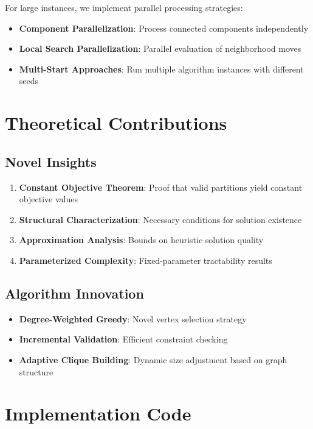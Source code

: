 \documentclass[12pt,a4paper]{article}
\begin{document}
For large instances, we implement parallel processing strategies:

\begin{itemize}
    \item \textbf{Component Parallelization}: Process connected components independently
    \item \textbf{Local Search Parallelization}: Parallel evaluation of neighborhood moves
    \item \textbf{Multi-Start Approaches}: Run multiple algorithm instances with different seeds
\end{itemize}

\section{Theoretical Contributions}

\subsection{Novel Insights}

\begin{enumerate}
    \item \textbf{Constant Objective Theorem}: Proof that valid partitions yield constant objective values
    \item \textbf{Structural Characterization}: Necessary conditions for solution existence
    \item \textbf{Approximation Analysis}: Bounds on heuristic solution quality
    \item \textbf{Parameterized Complexity}: Fixed-parameter tractability results
\end{enumerate}

\subsection{Algorithm Innovation}

\begin{itemize}
    \item \textbf{Degree-Weighted Greedy}: Novel vertex selection strategy
    \item \textbf{Incremental Validation}: Efficient constraint checking
    \item \textbf{Adaptive Clique Building}: Dynamic size adjustment based on graph structure
\end{itemize}

\section{Implementation Code}
\end{document}
